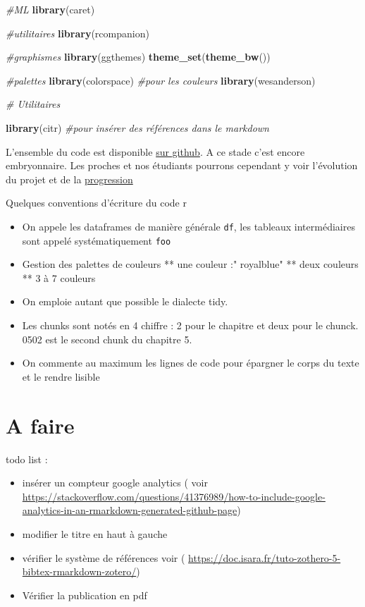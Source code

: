 \documentclass[
]{book}
\newenvironment{Shaded}{\begin{snugshade}}{\end{snugshade}}
\newcommand{\CommentTok}[1]{\textcolor[rgb]{0.56,0.35,0.01}{\textit{#1}}}
\newcommand{\KeywordTok}[1]{\textcolor[rgb]{0.13,0.29,0.53}{\textbf{#1}}}
\newcommand{\NormalTok}[1]{#1}
\providecommand{\tightlist}{%
  \setlength{\itemsep}{0pt}\setlength{\parskip}{0pt}}
\begin{document}
\begin{Shaded}
\begin{Highlighting}[]
\CommentTok{#ML}
\KeywordTok{library}\NormalTok{(caret)}

\CommentTok{#utilitaires}
\KeywordTok{library}\NormalTok{(rcompanion)}

\CommentTok{#graphismes}
\KeywordTok{library}\NormalTok{(ggthemes)}
\KeywordTok{theme_set}\NormalTok{(}\KeywordTok{theme_bw}\NormalTok{())}


\CommentTok{#palettes}
\KeywordTok{library}\NormalTok{(colorspace) }\CommentTok{#pour les couleurs}
\KeywordTok{library}\NormalTok{(wesanderson)}



\CommentTok{# Utilitaires}

\KeywordTok{library}\NormalTok{(citr) }\CommentTok{#pour insérer des références dans le markdown}
\end{Highlighting}
\end{Shaded}

L'ensemble du code est disponible \href{https://github.com/BenaventC/Datasciences}{sur github}. A ce stade c'est encore embryonnaire. Les proches et nos étudiants pourrons cependant y voir l'évolution du projet et de la \href{https://benaventc.github.io/Datascience/}{progression}

Quelques conventions d'écriture du code r

\begin{itemize}
\tightlist
\item
  On appele les dataframes de manière générale \texttt{df}, les tableaux intermédiaires sont appelé systématiquement \texttt{foo}
\item
  Gestion des palettes de couleurs
  ** une couleur :" royalblue"
  ** deux couleurs
  ** 3 à 7 couleurs
\item
  On emploie autant que possible le dialecte tidy.
\item
  Les chunks sont notés en 4 chiffre : 2 pour le chapitre et deux pour le chunck. 0502 est le second chunk du chapitre 5.
\item
  On commente au maximum les lignes de code pour épargner le corps du texte et le rendre lisible
\end{itemize}

\hypertarget{a-faire}{%
\section{A faire}\label{a-faire}}

todo list :

\begin{itemize}
\tightlist
\item
  insérer un compteur google analytics ( voir \url{https://stackoverflow.com/questions/41376989/how-to-include-google-analytics-in-an-rmarkdown-generated-github-page})
\item
  modifier le titre en haut à gauche
\item
  vérifier le système de références voir ( \url{https://doc.isara.fr/tuto-zothero-5-bibtex-rmarkdown-zotero/})
\item
  Vérifier la publication en pdf
\end{itemize}
\end{document}
